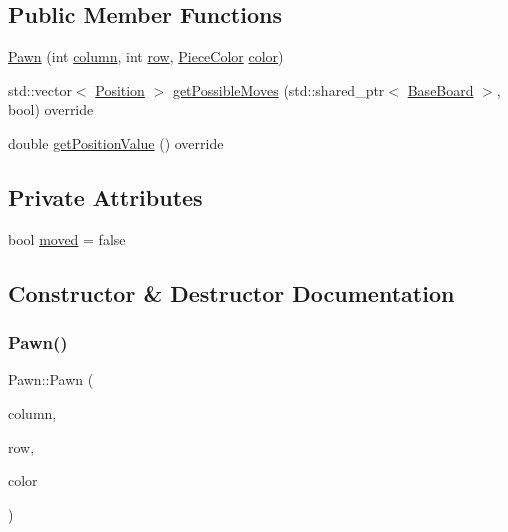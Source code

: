 \subsection*{Public Member Functions}
\begin{DoxyCompactItemize}
\item 
\hyperlink{class_pawn_a560979144129b551c2a27b2eb637d652}{Pawn} (int \hyperlink{class_piece_aa8f39e11280395103164f6ae07398c82}{column}, int \hyperlink{class_piece_ac6ef7c474f20562cb629c2452ce0631d}{row}, \hyperlink{_piece_8h_ad7595c48bb74c0dd2a7648712a2d4985}{Piece\+Color} \hyperlink{class_piece_a8dfe0501fe95a1a7618cf5ad3b9fda69}{color})
\item 
std\+::vector$<$ \hyperlink{struct_position}{Position} $>$ \hyperlink{class_pawn_af83688d6061d4dc14274af99bcbd2614}{get\+Possible\+Moves} (std\+::shared\+\_\+ptr$<$ \hyperlink{class_base_board}{Base\+Board} $>$, bool) override
\item 
double \hyperlink{class_pawn_a332e70ab65f480521428aa87c7cd2ef9}{get\+Position\+Value} () override
\end{DoxyCompactItemize}
\subsection*{Private Attributes}
\begin{DoxyCompactItemize}
\item 
bool \hyperlink{class_pawn_aac8df37fd58c41fe91460325e5447464}{moved} = false
\end{DoxyCompactItemize}


\subsection{Constructor \& Destructor Documentation}
\mbox{\label{class_pawn_a560979144129b551c2a27b2eb637d652}} 
\subsubsection{\texorpdfstring{Pawn()}{Pawn()}}
{\footnotesize\ttfamily Pawn\+::\+Pawn (\begin{DoxyParamCaption}\item[{int}]{column,  }\item[{int}]{row,  }\item[{\hyperlink{_piece_8h_ad7595c48bb74c0dd2a7648712a2d4985}{Piece\+Color}}]{color }\end{DoxyParamCaption})\hspace{0.3cm}{\ttfamily [inline]}}



